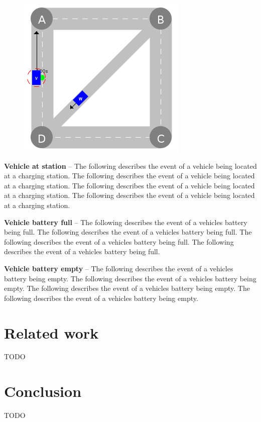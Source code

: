 \documentclass[graybox]{svmult}
\begin{document}
\begin{figure}
	\centering
	\includegraphics[scale=0.35]{../../events/vehicle-at-demand-drop-off.png}
\end{figure}

\noindent
\textbf{Vehicle at station}
--
The following describes the event of a vehicle being located at a charging station.
The following describes the event of a vehicle being located at a charging station.
The following describes the event of a vehicle being located at a charging station.
The following describes the event of a vehicle being located at a charging station.

\vspace{4mm}
\noindent
\textbf{Vehicle battery full}
--
The following describes the event of a vehicles battery being full.
The following describes the event of a vehicles battery being full.
The following describes the event of a vehicles battery being full.
The following describes the event of a vehicles battery being full.

\vspace{4mm}
\noindent
\textbf{Vehicle battery empty}
--
The following describes the event of a vehicles battery being empty.
The following describes the event of a vehicles battery being empty.
The following describes the event of a vehicles battery being empty.
The following describes the event of a vehicles battery being empty.

\section{Related work}
\label{sec:related}
TODO

\section{Conclusion}
\label{sec:con}
TODO



\end{document}

